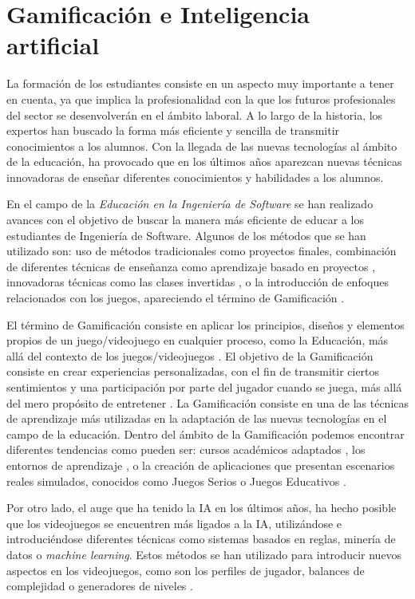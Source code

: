 \section{Gamificación e Inteligencia artificial}
\label{sec:Gamificacion}
La formación de los estudiantes consiste en un aspecto muy importante a tener en cuenta, ya que implica la profesionalidad con la que los futuros profesionales del sector se desenvolverán en el ámbito laboral. A lo largo de la historia, los expertos han buscado la forma más eficiente y sencilla de transmitir conocimientos a los alumnos. Con la llegada de las nuevas tecnologías al ámbito de la educación, ha provocado que en los últimos años aparezcan nuevas técnicas innovadoras de enseñar diferentes conocimientos y habilidades a los alumnos.

En el campo de la \emph{Educación en la Ingeniería de Software} se han realizado avances con el objetivo de buscar la manera más eficiente de educar a los estudiantes de Ingeniería de Software. Algunos de los métodos que se han utilizado son: uso de métodos tradicionales como proyectos finales, combinación de diferentes técnicas de enseñanza como aprendizaje basado en proyectos \cite{alabbadi2016proposed}, innovadoras técnicas como las clases invertidas \cite{choi2013applying}, o la introducción de enfoques relacionados con los juegos, apareciendo el término de Gamificación \cite{connolly2007application}.

El término de Gamificación consiste en aplicar los principios, diseños y elementos propios de un juego/videojuego en cualquier proceso, como la Educación, más allá del contexto de los juegos/videojuegos \cite{gallego2014panoramica}. El objetivo de la Gamificación consiste en crear experiencias personalizadas, con el fin de transmitir ciertos sentimientos y una participación por parte del jugador cuando se juega, más allá del mero propósito de entretener \cite{alhammad2018gamification}. La Gamificación consiste en una de las técnicas de aprendizaje más utilizadas en la adaptación de las nuevas tecnologías en el campo de la educación. Dentro del ámbito de la Gamificación podemos encontrar diferentes tendencias como pueden ser: cursos académicos adaptados \cite{murphy2008distance}, los entornos de aprendizaje \cite{burnell2002teaching}, o la creación de aplicaciones que presentan escenarios reales simulados, conocidos como Juegos Serios o Juegos Educativos \cite{meneely2009preparing}.

Por otro lado, el auge que ha tenido la IA en los últimos años, ha hecho posible que los videojuegos se encuentren más ligados a la IA, utilizándose e introduciéndose diferentes técnicas como sistemas basados en reglas, minería de datos o \emph{machine learning}. Estos métodos se han utilizado para introducir nuevos aspectos en los videojuegos, como son los perfiles de jugador, balances de complejidad o generadores de niveles \cite{westera2020artificial}.

